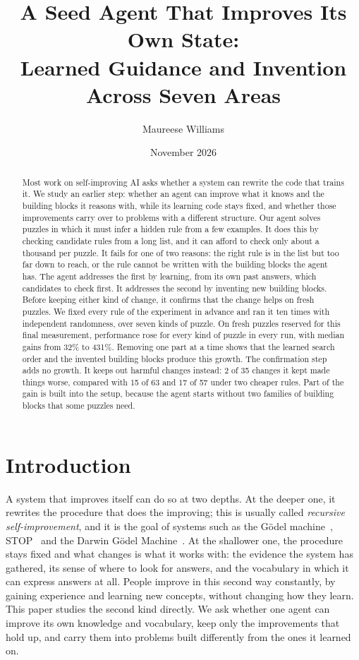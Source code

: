 \documentclass[11pt]{article}
\title{A Seed Agent That Improves Its Own State:\\ Learned Guidance and Invention Across Seven Areas}
\author{Maureese Williams}
\date{November 2026}
\begin{document}
\maketitle

\begin{abstract}
Most work on self-improving AI asks whether a system can rewrite the code that trains it. We study an earlier step: whether an agent can improve what it knows and the building blocks it reasons with, while its learning code stays fixed, and whether those improvements carry over to problems with a different structure. Our agent solves puzzles in which it must infer a hidden rule from a few examples. It does this by checking candidate rules from a long list, and it can afford to check only about a thousand per puzzle. It fails for one of two reasons: the right rule is in the list but too far down to reach, or the rule cannot be written with the building blocks the agent has. The agent addresses the first by learning, from its own past answers, which candidates to check first. It addresses the second by inventing new building blocks. Before keeping either kind of change, it confirms that the change helps on fresh puzzles. We fixed every rule of the experiment in advance and ran it ten times with independent randomness, over seven kinds of puzzle. On fresh puzzles reserved for this final measurement, performance rose for every kind of puzzle in every run, with median gains from 32\% to 431\%. Removing one part at a time shows that the learned search order and the invented building blocks produce this growth. The confirmation step adds no growth. It keeps out harmful changes instead: 2 of 35 changes it kept made things worse, compared with 15 of 63 and 17 of 57 under two cheaper rules. Part of the gain is built into the setup, because the agent starts without two families of building blocks that some puzzles need.
\end{abstract}

\section{Introduction}

A system that improves itself can do so at two depths. At the deeper one, it rewrites the procedure that does the improving; this is usually called \emph{recursive self-improvement}, and it is the goal of systems such as the G\"odel machine~\cite{schmidhuber2007}, STOP~\cite{zelikman2023} and the Darwin G\"odel Machine~\cite{zhang2025}. At the shallower one, the procedure stays fixed and what changes is what it works with: the evidence the system has gathered, its sense of where to look for answers, and the vocabulary in which it can express answers at all. People improve in this second way constantly, by gaining experience and learning new concepts, without changing how they learn. This paper studies the second kind directly. We ask whether one agent can improve its own knowledge and vocabulary, keep only the improvements that hold up, and carry them into problems built differently from the ones it learned on.
\end{document}

